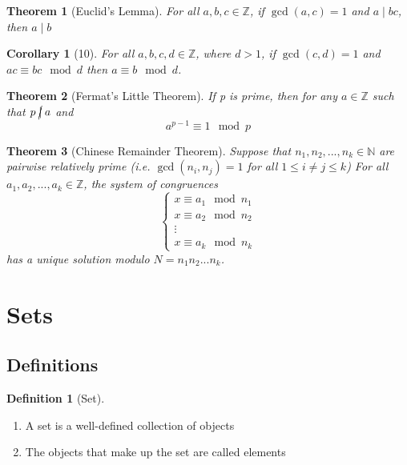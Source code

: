 \documentclass[12pt]{article}
\newtheorem*{thm*}{Theorem}
\newtheorem{cor}[thm]{Corollary}
\theoremstyle{definition}
\newtheorem{defn}[thm]{Definition}
\theoremstyle{remark}
\numberwithin{equation}{section}
\newcommand\Z{\mathbb Z}    %
\newcommand\N{\mathbb N}    %
\begin{document}
\begin{thm*}[Euclid's Lemma]
        For all $a,b,c \in \Z$, if $\gcd(a,c) = 1$ and $a\;\vert\;bc$, then $a\;\vert\;b$
\end{thm*}

\begin{cor}[10]
        For all $a,b,c,d \in \Z$, where $d > 1$, if $\gcd(c,d) = 1$ and $ac \equiv bc \mod d$ then $a \equiv b \mod d$.
\end{cor}


\begin{thm*}[Fermat's Little Theorem]
        If p is prime, then for any $a \in \Z$ such that $p\;\cancel{\vert}\;a$ and $$a^{p-1}\equiv 1 \mod p$$
\end{thm*}



\begin{thm*}[Chinese Remainder Theorem]
        Suppose that $n_1,n_2,...,n_k \in \N$ are pairwise relatively prime (i.e. $\gcd(n_i,n_j) = 1$ for all $1 \leq i \neq j \leq k$) For all $a_1,a_2,...,a_k \in \Z$, the system of congruences 
        \begin{equation}
                \left\{\begin{array}{c}
                        x \equiv a_1 \mod n_1 \\
                        x \equiv a_2 \mod n_2 \\
                        \vdots \\
                        x \equiv a_k \mod n_k
                \end{array}\right.
        \end{equation}
        has a unique solution modulo $N = n_1n_2...n_k$.
\end{thm*}



\clearpage


\section{Sets}


\subsection{Definitions}


\begin{defn}[Set]
        \begin{enumerate}
                \item A set is a well-defined collection of objects 
                \item The objects that make up the set are called elements
        \end{enumerate}
\end{defn}
\end{document}
